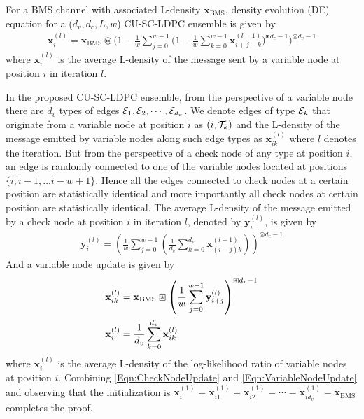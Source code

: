 \documentclass[journal,draftcls,onecolumn,12pt,twoside]{IEEEtran}
\begin{document}
\begin{lemma}\label{Lemma:DE_SCLDPC}
For a BMS channel with associated L-density $\mathbf{x}_{\text{BMS}}$\cite{richardson2008modern}, density evolution (DE) equation for a ($d_{v},d_{c},L,w$) CU-SC-LDPC ensemble is given by
\begin{align}
\mathbf{x}_{i}^{(l)}\!=\!\mathbf{x}_{\text{BMS}}\!\circledast\!\bigg( 1-\frac{1}{w}\sum_{j=0}^{w-1}\!\Big(1-\frac{1}{w}\sum_{k=0}^{w-1}\mathbf{x}_{i+j-k}^{(l-1)}\Big)^{\boxast d_{c}-1} \bigg)^{\circledast d_{v}-1}
\label{Eqn:DE_SCLDPC}
\end{align}
where $\mathbf{x}_{i}^{(l)}$ is the average L-density of the message sent by a variable node at position $i$ in iteration $l$.
\end{lemma}
\begin{IEEEproof}
In the proposed CU-SC-LDPC ensemble, from the perspective of a variable node there are $d_{v}$ types of edges $\mathcal{E}_{1},\mathcal{E}_{2},\cdots,\mathcal{E}_{d_{v}}$. We denote edges of type $\mathcal{E}_{k}$ that originate from a variable node at position $i$ as $(i,\mathcal{T}_{k})$ and the L-density of the message emitted by variable nodes along such edge types as $\mathbf{x}_{ik}^{(l)}$ where $l$  denotes the iteration. But from the perspective of a check node of any type at position $i$, an edge is randomly connected to one of the variable nodes located at positions $\{i, i-1,... i-w+1\}$.	Hence all the edges connected to check nodes at a certain position are statistically identical and more importantly all check nodes at certain position are statistically identical. The average L-density of the message emitted by a check node at position $i$ in iteration $l$, denoted by $\mathbf{y}_{i}^{(l)}$, is given by
\begin{align}
\mathbf{y}_{i}^{(l)}=\left(\frac{1}{w}\sum_{j=0}^{w-1}\left(\frac{1}{d_{v}}\sum_{k=0}^{d_{v}}\mathbf{x}_{(i-j)k}^{(l-1)}\right)\right)^{\circledast d_{c}-1}
\label{Eqn:CheckNodeUpdate}
\end{align}
And a variable node update is given by
\begin{align}
\mathbf{x}_{ik}^{(l)}&=\mathbf{x}_{\text{BMS}}\boxast \left(\frac{1}{w}\sum_{j=0}^{w-1}\mathbf{y}_{i+j}^{(l)}\right)^{\boxast d_{v}-1}\label{Eqn:VariableNodeUpdate}\\
\mathbf{x}_{i}^{(l)}&=\frac{1}{d_{v}}\sum_{k=0}^{d_{v}}\mathbf{x}_{ik}^{(l)}\notag
\end{align}
where $\mathbf{x}_{i}^{(l)}$ is the average L-density of the log-likelihood ratio of variable nodes at position $i$.
Combining \eqref{Eqn:CheckNodeUpdate} and \eqref{Eqn:VariableNodeUpdate} and observing that the initialization
is $\mathbf{x}_{i}^{(1)}=\mathbf{x}_{i1}^{(1)}=\mathbf{x}_{i2}^{(1)}=\cdots=\mathbf{x}_{id_{v}}^{(1)}=\mathbf{x}_{\text{BMS}}$ completes the proof.
\end{IEEEproof}
\end{document}
